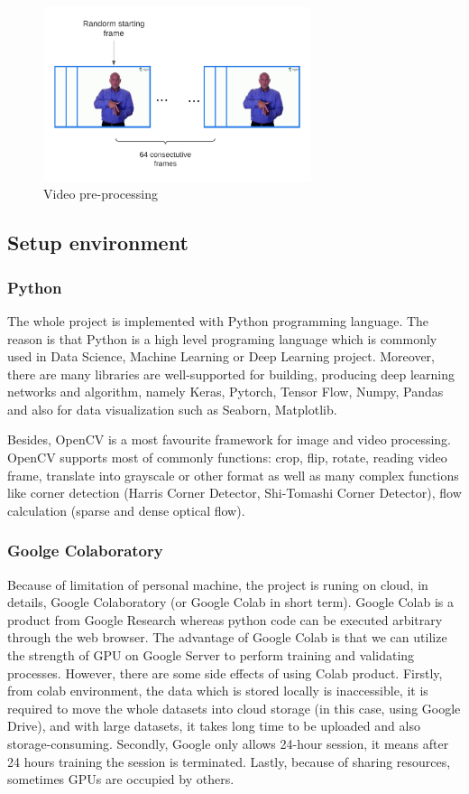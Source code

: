 \documentclass[a4paper, 12pt]{article}
\begin{document}
\begin{figure}[H]
    \centering
    \includegraphics[width=0.7\textwidth]{data pre-processing.png}
    \caption{Video pre-processing}
    \label{fig:data preprocessing}
\end{figure}

\subsection{Setup environment}
\subsubsection{Python}
The whole project is implemented with Python programming language. The reason is that Python is a high level programing language which is commonly used in Data Science, Machine Learning or Deep Learning project. Moreover, there are many libraries are well-supported for building, producing deep learning networks and algorithm, namely Keras, Pytorch, Tensor Flow, Numpy, Pandas and also for data visualization such as Seaborn, Matplotlib.

Besides, OpenCV is a most favourite framework for image and video processing. OpenCV supports most of commonly functions: crop, flip, rotate, reading video frame, translate into grayscale or other format as well as many complex functions like corner detection (Harris Corner Detector, Shi-Tomashi Corner Detector), flow calculation (sparse and dense optical flow).

\subsubsection{Goolge Colaboratory}
Because of limitation of personal machine, the project is runing on cloud, in details, Google Colaboratory (or Google Colab in short term). Google Colab is a product from Google Research whereas python code can be executed arbitrary through the web browser. The advantage of Google Colab is that we can utilize the strength of GPU on Google Server to perform training and validating processes. However, there are some side effects of using Colab product. Firstly, from colab environment, the data which is stored locally is inaccessible, it is required to move the whole datasets into cloud storage (in this case, using Google Drive), and with large datasets, it takes long time to be uploaded and also storage-consuming. Secondly, Google only allows 24-hour session, it means after 24 hours training the session is terminated. Lastly, because of sharing resources, sometimes GPUs are occupied by others.
\end{document}
